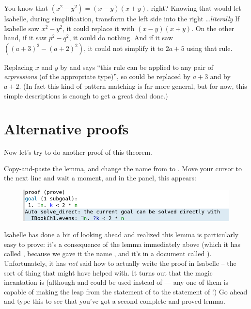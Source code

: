 You know that $(x^2 - y^2) = (x-y)(x+y)$, right? Knowing that would let Isabelle, during simplification, transform the left side into the right \ldots \textit{literally}  If Isabelle saw $x^2 - y^2$, it could replace it with $(x-y)(x+y)$. On the other hand, if it saw $p^2 - q^2$, it could do nothing. And if it saw $((a+3)^2 - (a+2)^2)$, it could not simplify it to $2a + 5$ using that rule. 

Replacing $x$ and $y$ by  and  says ``this rule can be applied to any pair of \textit{expressions} (of the appropriate type)'', so  could be replaced by $a+3$ and  by $a+2$. (In fact this kind of pattern matching is far more general, but for now, this simple descriptions is enough to get a great deal done.)

\section{Alternative proofs}
Now let's try to do another proof of this theorem. 

\task Copy-and-paste the lemma, and change the name from  to . Move your cursor to the next line and wait a moment, and in the  panel, this appears:

\begin{figure}[h]
    \includegraphics[width=1\linewidth]{TEXT/C01/Images/auto-proof.png}
\end{figure}

Isabelle has done a bit of looking ahead and realized this lemma is particularly easy to prove: it's a consequence of the lemma immediately above (which it has called , because we gave it the name , and it's in a document called ). Unfortunately, it has \textit{not} said how to actually write the proof in Isabelle -- the sort of thing that  might have helped with. It turns out that the magic incantation is  (although  and  could be used instead of  --- any one of them is capable of making the leap from the statement of  to the statement of !) Go ahead and type this to see that you've got a second complete-and-proved lemma.
\etask 


